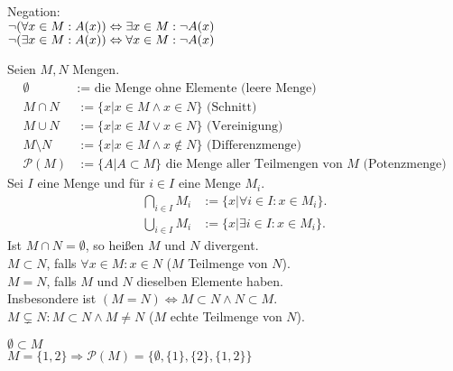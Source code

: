 \documentclass[../ana1.tex]{subfiles}
\begin{document}
Negation:\\
$\neg (\forall x \in M : A(x)) \\ \Leftrightarrow \exists x \in M : \neg A(x)$\\
$\neg (\exists x \in M : A(x)) \\ \Leftrightarrow \forall x \in M : \neg A(x)$
\begin{defi}
	Seien $M,N$ Mengen.
	\begin{align*}
		\emptyset      & := \text{ die Menge ohne Elemente (leere Menge)}                                        \\
		M \cap N       & := \{x | x \in M \wedge x \in N \} \text{ (Schnitt)}                                    \\
		M \cup N       & := \{x | x \in M \vee x \in N \} \text{ (Vereinigung)}                                  \\
		M \setminus N  & := \{x | x \in M \wedge x \notin N \} \text{ (Differenzmenge)}                          \\
		\mathcal{P}(M) & := \{A | A \subset M \} \text{ die Menge aller Teilmengen von } M \text{ (Potenzmenge)}
	\end{align*}
	Sei $I$ eine Menge und für $i\in I$ eine Menge $M_i$.
	\begin{align*}
		\bigcap\limits_{i\in I} M_i & := \{x | \forall i \in I:x\in M_i\}. \\
		\bigcup\limits_{i\in I} M_i & := \{x | \exists i \in I:x\in M_i\}.
	\end{align*}
	Ist $M\cap N = \emptyset$, so heißen $M$ und $N$ divergent.\\
	$M\subset N$, falls $\forall x \in M: x \in N$ ($M$ Teilmenge von $N$).\\
	$M = N$, falls $M$ und $N$ dieselben Elemente haben.\\
	Insbesondere ist $(M=N) \Leftrightarrow M\subset N \wedge N\subset M$.\\
	$M \subsetneq N : M \subset N \wedge M \neq N$ ($M$ echte Teilmenge von $N$).
\end{defi}
\begin{bsp}
	$\emptyset \subset M$\\
	$M = \{1,2\} \Rightarrow \mathcal{P}(M) = \{\emptyset, \{1\}, \{2\}, \{1,2\}\}$
\end{bsp}
\end{document}
